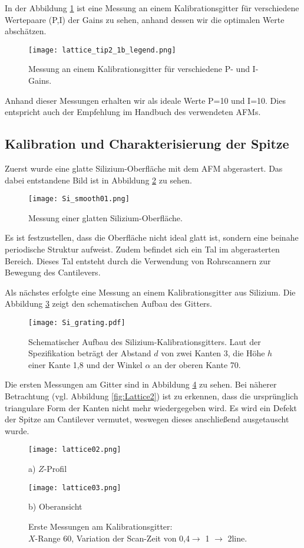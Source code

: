 In der Abbildung \ref{fig:gain} ist eine Messung an einem Kalibrationsgitter für verschiedene Wertepaare (P,I) der Gains zu sehen, anhand dessen wir die optimalen Werte abschätzen.
\begin{figure}[h]
	\centering
	\texttt{[image: lattice\_tip2\_1b\_legend.png]}
	\caption[Bestimmung des P- und I-Gains]{Messung an einem Kalibrationsgitter für verschiedene P- und I-Gains.}
\label{fig:gain}
\end{figure}
Anhand dieser Messungen erhalten wir als ideale Werte P=10 und I=10. Dies entspricht auch der Empfehlung im Handbuch des verwendeten AFMs.
\subsection{Kalibration und Charakterisierung der Spitze}
Zuerst wurde eine glatte Silizium-Oberfläche mit dem AFM abgerastert. Das dabei entstandene Bild ist in Abbildung \ref{fig:Si_smooth01} zu sehen.
\begin{figure}[h]
	\centering
	\texttt{[image: Si\_smooth01.png]}
	\caption{Messung einer glatten Silizium-Oberfläche.}
	\label{fig:Si_smooth01}
\end{figure}
Es ist festzustellen, dass die Oberfläche nicht ideal glatt ist, sondern eine beinahe periodische Struktur aufweist. Zudem befindet sich ein Tal im abgerasterten Bereich. Dieses Tal entsteht durch die Verwendung von Rohrscannern zur Bewegung des Cantilevers.

Als nächstes erfolgte eine Messung an einem Kalibrationsgitter aus Silizium. Die Abbildung \ref{fig:Si_grating} zeigt den schematischen Aufbau des Gitters.
\begin{figure}[H]
	\centering
	\texttt{[image: Si\_grating.pdf]}
	\caption[Schematischer Aufbau des Silizium-Kalibrationsgitters]{Schematischer Aufbau des Silizium-Kalibrationsgitters. Laut der Spezifikation beträgt der Abstand $d$ von zwei Kanten 3\micro\metre, die Höhe $h$ einer Kante 1,8\micro\metre{} und der Winkel $\alpha$ an der oberen Kante 70\degree.}
	\label{fig:Si_grating}
\end{figure}
Die ersten Messungen am Gitter sind in Abbildung \ref{fig:Lattice1} zu sehen. Bei näherer Betrachtung (vgl. Abbildung \ref{fig:Lattice2}) ist zu erkennen, dass die ursprünglich triangulare Form der Kanten nicht mehr wiedergegeben wird. Es wird ein Defekt der Spitze am Cantilever vermutet, weswegen dieses anschließend ausgetauscht wurde.
\begin{figure}[H]
	\centering
\begin{minipage}{0.45\textwidth}
\centering
		\texttt{[image: lattice02.png]}
		\caption*{a) $Z$-Profil}
	\end{minipage}
	\hfill
\begin{minipage}{0.45\textwidth}
\centering
		\texttt{[image: lattice03.png]}
		\caption*{b) Oberansicht}
	\end{minipage}
	\caption[Erste Messungen am Kalibrationsgitter]{Erste Messungen am Kalibrationsgitter:\\ $X$-Range 60\micro\metre,  Variation der Scan-Zeit von 0,4$\rightarrow$ 1 $\rightarrow$ 2\second\per line.}
	\label{fig:Lattice1}
\end{figure}

